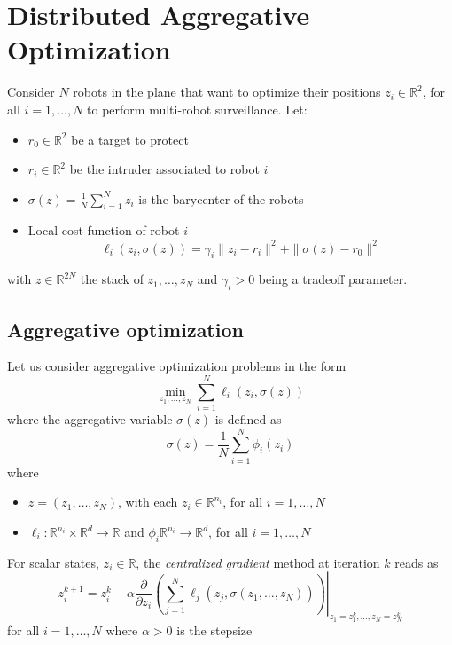 \documentclass{book}
\newcommand{\R}{\mathbb{R}}
\theoremstyle{theoremv2}
\theoremstyle{defv2}
\theoremstyle{remark}
\theoremstyle{remark}
\theoremstyle{definition}
\theoremstyle{definition}
\begin{document}
\chapter{Distributed Aggregative Optimization}
Consider $N$ robots in the plane that want to optimize their positions $z_i\in\R^2$, for all $i=1,\dots,N$ to perform multi-robot surveillance. Let:
\begin{itemize}
    \item $r_0\in\R^2$ be a target to protect 
    \item $r_i\in\R^2$ be the intruder associated to robot $i$ 
    \item $\sigma(z) = \displaystyle\frac{1}{N}\displaystyle\sum_{i=1}^{N}z_i$ is the barycenter of the robots 
    \item Local cost function of robot $i$ 
        \[
            \ell_i(z_i,\sigma(z)) = \gamma_i\|z_i-r_i\|^2 + \|\sigma(z)-r_0\|^2
        \]
\end{itemize}
with $z\in\R^{2N}$ the stack of $z_1,\dots,z_N$ and $\gamma_i>0$ being a tradeoff parameter.
\section{Aggregative optimization}
Let us consider aggregative optimization problems in the form 
\[
    \min_{z_1,\dots,z_N} \displaystyle\sum_{i=1}^{N} \ell_i(z_i,\sigma(z))
\]
where the aggregative variable $\sigma(z)$ is defined as 
\[
    \sigma(z) = \displaystyle\frac{1}{N}\displaystyle\sum_{i=1}^{N} \phi_i(z_i)
\]
where 
\begin{itemize}
    \item $z=(z_1,\dots,z_N)$, with each $z_i\in\R^{n_i}$, for all $i=1,\dots,N$
    \item $\ell_i:\R^{n_i}\times\R^d\to\R$ and $\phi_i\R^{n_i}\to\R^d$, for all $i=1,\dots,N$
\end{itemize}
For scalar states, $z_i\in\R$, the \emph{centralized gradient} method at iteration $k$ reads as 
\[
    z_i^{k+1} = z_i^k -\alpha \displaystyle\frac{\partial}{\partial z_i}\left. \left(\displaystyle\sum_{j=1}^{N}\ell_j(z_j,\sigma(z_1,\dots,z_N))\right)\right|_{z_1 = z_1^k,\dots,z_N = z_N^k}
\]
for all $i=1,\dots,N$ where $\alpha>0$ is the stepsize
\end{document}
